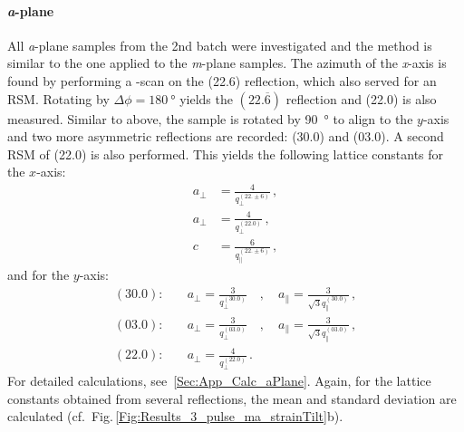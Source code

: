 \paragraph{\textit{a}-plane}
    All \textit{a}-plane samples from the 2nd batch were investigated and the method is similar to the one applied to the \textit{m}-plane samples.
    The azimuth of the \textit{x}-axis is found by performing a \textphi-scan on the (22.6) reflection, which also served for an \gls{RSM}.
    Rotating by $\Delta\phi=\qty{180}{\degree}$ yields the $(22.\overline{6})$ reflection and (22.0) is also measured.
    Similar to above, the sample is rotated by \qty{90}{\degree} to align to the $y$-axis and two more asymmetric reflections are recorded: (30.0) and (03.0).
    A second \gls{RSM} of (22.0) is also performed.
    This yields the following lattice constants for the $x$-axis:
    \begin{align}
        a_\perp &= \frac{4}{q_\perp^{(22.\pm6)}} \,,\\
        a_\perp &= \frac{4}{q_\perp^{(22.0)}}\,,\\
        c &= \frac{6}{q_\parallel^{(22.\pm6)}} \,,
    \end{align}
    and for the $y$-axis:
    \begin{align}
        (30.0):&\quad
            a_\perp = \frac{3}{q_\perp^{(30.0)}}
            \quad,\quad
            a_\parallel = \frac{3}{\sqrt{3}q_\parallel^{(30.0)}}\,,\\
        (03.0):&\quad
            a_\perp = \frac{3}{q_\perp^{(03.0)}}
            \quad,\quad
            a_\parallel = \frac{3}{\sqrt{3}q_\parallel^{(03.0)}}\,,\\
        (22.0):&\quad
            a_\perp = \frac{4}{q_\perp^{(22.0)}}\,.
    \end{align}
    For detailed calculations, see\ \ref{Sec:App_Calc_aPlane}.
    Again, for the lattice constants obtained from several reflections, the mean and standard deviation are calculated (cf.\ Fig.\,\ref{Fig:Results_3_pulse_ma_strainTilt}b).
